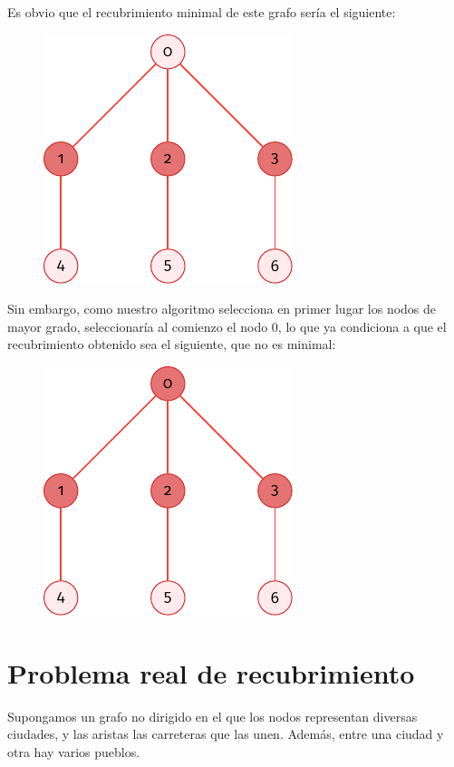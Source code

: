 \documentclass[11pt]{article}
\begin{document}
Es obvio que el recubrimiento minimal de este grafo sería el siguiente:

\begin{figure}[H]
	\centering \includegraphics{./img/grafo2-minimal.pdf}
\end{figure}

Sin embargo, como nuestro algoritmo selecciona en primer lugar los nodos de mayor grado, seleccionaría al comienzo el nodo $0$, lo que ya condiciona a que el recubrimiento obtenido sea el siguiente, que no es minimal:

\begin{figure}[H]
	\centering \includegraphics{./img/grafo2-no-minimal.pdf}
\end{figure}

\section*{Problema real de recubrimiento}

Supongamos un grafo no dirigido en el que los nodos representan diversas ciudades, y las aristas las carreteras que las unen. Además, entre una ciudad y otra hay varios pueblos.\\
\end{document}
